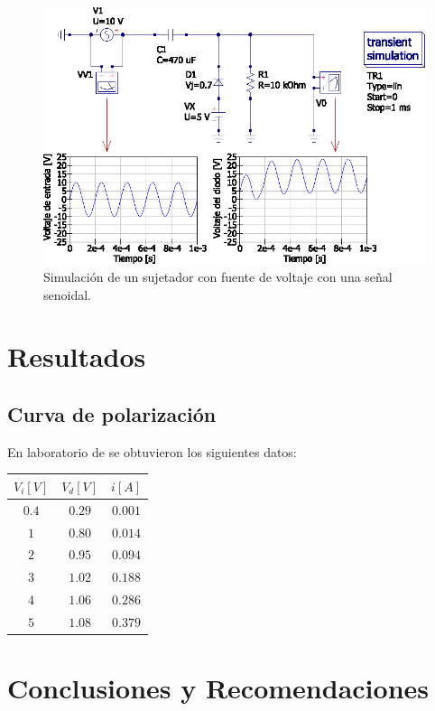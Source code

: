 \documentclass[letter,twoside,11pt]{article}
\begin{document}
{\begin{figure}[!h]
\centering
\includegraphics[scale=1.00]{simulacion/practica1.13.eps}
\caption{Simulación de un sujetador con fuente de voltaje con una señal senoidal.}
\label{simulacion13}
\end{figure}

\section{Resultados}

\subsection{Curva de polarización}
En laboratorio de se obtuvieron los siguientes datos:

\begin{center}
    \begin{tabular}{|c|c|c|}
    \hline
    $V_i [V]$ & $V_d [V]$ & $i [A]$
    \tabularnewline \hline \hline
    $0.4$ & $0.29$ & $0.001$ \tabularnewline \hline
    $1$   & $0.80$ & $0.014$ \tabularnewline \hline
    $2$   & $0.95$ & $0.094$ \tabularnewline \hline
    $3$   & $1.02$ & $0.188$ \tabularnewline \hline
    $4$   & $1.06$ & $0.286$ \tabularnewline \hline
    $5$   & $1.08$ & $0.379$ \tabularnewline \hline
    \end{tabular}
\end{center}

\section{Conclusiones y Recomendaciones}

\begin{thebibliography}{99}


\end{thebibliography}}
\end{document}
